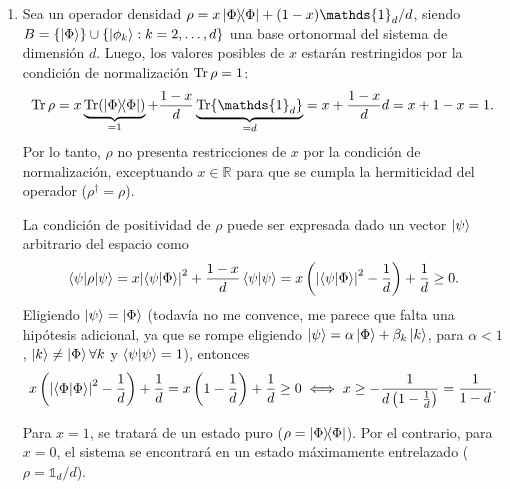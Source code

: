 \documentclass{scrartcl}
\newcommand{\inv}[1]{\frac{1}{#1}}
\newcommand{\realSet}{\mathbb{R}}
\DeclareRobustCommand{\[}{\begin{equation}}
\DeclareRobustCommand{\]}{\end{equation}}
\begin{document}
\begin{enumerate}
    
    
    \item Sea un operador densidad $\rho = x \dyad{\Phi}{\Phi} + (1-x) \mathds{1}_d / d$, siendo $B = \{ \ket{\Phi} \} \cup \{ \ket{\phi_{k}} : k = 2,\dots, d \}$ una base ortonormal del sistema de dimensión $d$. Luego, los valores posibles de $x$ estarán restringidos por la condición de normalización $\Tr \rho = 1$:
    \[ \Tr \rho = x \underbrace{\Tr(\dyad{\Phi}{\Phi})}_{=1} + \frac{1-x}{d} \underbrace{\Tr{\mathds{1}_d}}_{=d} = x + \frac{1-x}{d} d = x + 1 - x = 1. \]
    Por lo tanto, $\rho$ no presenta restricciones de $x$ por la condición de normalización, exceptuando $x \in \realSet$ para que se cumpla la hermiticidad del operador ($\rho^\dagger = \rho$).
    
    La condición de positividad de $\rho$ puede ser expresada dado un vector $\ket{\psi}$ arbitrario del espacio como
    \[ \mel{\psi}{\rho}{\psi} = x \abs{\ip{\psi}{\Phi}}^2 + \frac{1 - x}{d} \ip{\psi}{\psi} = x \left( \abs{\ip{\psi}{\Phi}}^2 - \inv{d} \right) + \inv{d} \geq 0. \]
    Eligiendo $\ket{\psi} = \ket{\Phi}$ (todavía no me convence, me parece que falta una hipótesis adicional, ya que se rompe eligiendo $\ket{\psi} = \alpha \ket{\Phi} + \beta_k \ket{k}$, para $\alpha < 1$, $\ket{k} \neq \ket{\Phi} \forall k$ y $\ip{\psi}{\psi} = 1$), entonces
    \[ x \left( \abs{\ip{\Phi}{\Phi}}^2 - \inv{d} \right) + \inv{d} = x \left( 1 - \inv{d} \right) + \inv{d} \geq 0 \iff x \geq -\inv{d \left(1 - \frac{1}{d} \right)} = \inv{1 - d}. \]
    
    Para $x=1$, se tratará de un estado puro ($\rho = \dyad{\Phi}{\Phi}$). Por el contrario, para $x = 0$, el sistema se encontrará en un estado máximamente entrelazado ($\rho = \mathds{1}_d / d$).
    
\end{enumerate}
\end{document}

